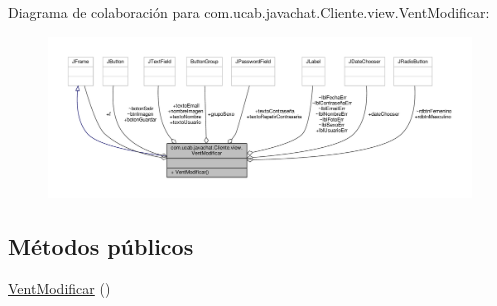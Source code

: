 Diagrama de colaboración para com.\-ucab.\-javachat.\-Cliente.\-view.\-Vent\-Modificar\-:\nopagebreak
\begin{figure}[H]
\begin{center}
\leavevmode
\includegraphics[width=350pt]{classcom_1_1ucab_1_1javachat_1_1_cliente_1_1view_1_1_vent_modificar__coll__graph}
\end{center}
\end{figure}
\subsection*{Métodos públicos}
\begin{DoxyCompactItemize}
\item 
\hyperlink{classcom_1_1ucab_1_1javachat_1_1_cliente_1_1view_1_1_vent_modificar_a59e6db88994574f70aae82d250a847cb}{Vent\-Modificar} ()
\end{DoxyCompactItemize}

